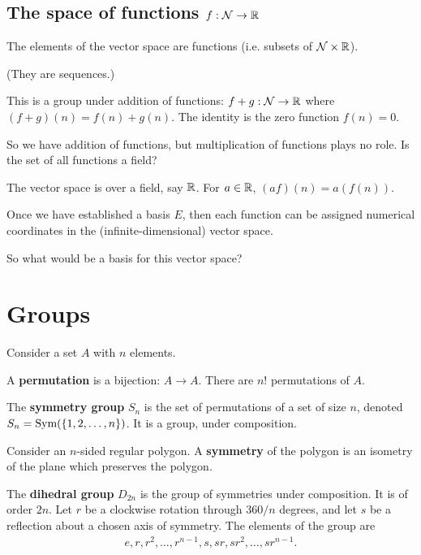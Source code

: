 \subsection{The space of functions $f:\mathcal{N} \to \mathbb{R}$}

The elements of the vector space are functions (i.e. subsets of $\mathcal{N} \times \mathbb{R}$).

(They are sequences.)

This is a group under addition of functions: $f + g: \mathcal{N} \to \mathbb{R}$ where
$(f + g)(n) = f(n) + g(n)$. The identity is the zero function $f(n) = 0$.

So we have addition of functions, but multiplication of functions plays no
role. Is the set of all functions a field?


The vector space is over a field, say $\mathbb{R}$. For $a \in \mathbb{R}$, $(af)(n) = a(f(n))$.

Once we have established a basis $E$, then each function can be assigned
numerical coordinates in the (infinite-dimensional) vector space.

So what would be a basis for this vector space?




\newpage
\section{Groups}

Consider a set $A$ with $n$ elements.

\begin{definition*}
  A \textbf{permutation} is a bijection: $A \to A$. There are $n!$ permutations of $A$.
\end{definition*}

\begin{definition*}
  The \textbf{symmetry group} $S_n$ is the set of permutations of a set of size $n$, denoted
  $S_n = \text{Sym}(\{1,2,\ldots,n\})$. It is a group, under composition.
\end{definition*}

\begin{definition*}
  Consider an $n$-sided regular polygon. A \textbf{symmetry} of the polygon is an isometry of the
  plane which preserves the polygon.
\end{definition*}

\begin{definition*}
  The \textbf{dihedral group}
  $D_{2n}$ is the group of symmetries under composition. It is of order $2n$. Let
  $r$ be a clockwise rotation through $360/n$ degrees, and let $s$ be a
  reflection about a chosen axis of symmetry. The elements of the group are
  \begin{align*}
    e, r, r^2, \ldots, r^{n-1}, s, sr, sr^2, \ldots, sr^{n-1}.
  \end{align*}
\end{definition*}

